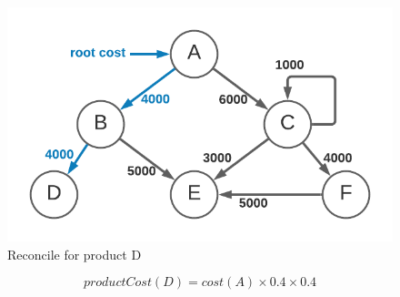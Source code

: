 \documentclass[10pt, a4paper, twocolumn]{article}
\begin{document}
    \begin{figure}[H]
      \centering
      \includegraphics[width=\linewidth]{./truth-and-reconciliation-reconcile-d.png}
      \caption{Reconcile for product D}
      \label{figure:4}
    \end{figure}

    \[ productCost(D) = cost(A) \times 0.4 \times 0.4 \]
\end{document}
